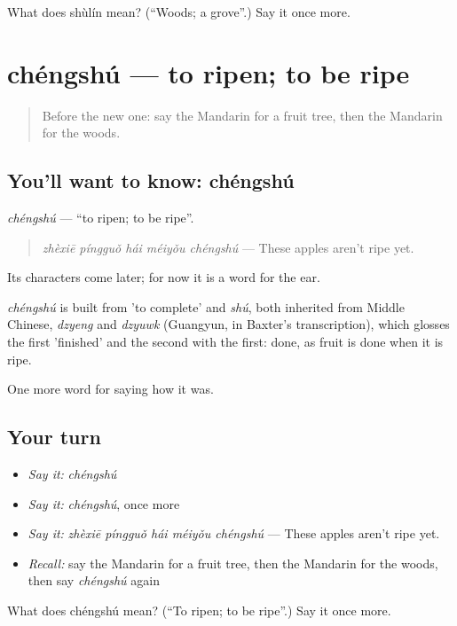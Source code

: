 \begin{tcolorbox}[breakable,colback=teal!4,colframe=teal!35!black,title={Before you move on}]
What does shùlín mean? (\textquotedblleft{}Woods; a grove\textquotedblright{}.) Say it once more.
\end{tcolorbox}
\section[chéngshú]{chéngshú — to ripen; to be ripe}

\label{lesson:ZH-C516-chengshu}



\begin{quote}
Before the new one: say the Mandarin for a fruit tree, then the Mandarin for the woods.
\end{quote}

\subsection*{You'll want to know: chéngshú}
\emph{chéngshú} — \textquotedblleft{}to ripen; to be ripe\textquotedblright{}.

\begin{quote}
\emph{zhèxiē píngguǒ hái méiyǒu chéngshú} — These apples aren't ripe yet.
\end{quote}

Its characters come later; for now it is a word for the ear.

\begin{cousinweb}
\emph{chéngshú} is built from  'to complete' and \emph{shú}, both inherited from Middle Chinese, \emph{dzyeng} and \emph{dzyuwk} (Guangyun, in Baxter's transcription), which glosses the first 'finished' and the second with the first: done, as fruit is done when it is ripe.
\end{cousinweb}

\begin{grammarlens}[title={What you've built}]
One more word for saying how it was.
\end{grammarlens}

\subsection*{Your turn}
\begin{itemize}
\raggedright
  \item \emph{Say it:} \emph{chéngshú}
  \item \emph{Say it:} \emph{chéngshú}, once more
  \item \emph{Say it:} \emph{zhèxiē píngguǒ hái méiyǒu chéngshú} — These apples aren't ripe yet.
  \item \emph{Recall:} say the Mandarin for a fruit tree, then the Mandarin for the woods, then say \emph{chéngshú} again
\end{itemize}

\begin{tcolorbox}[breakable,colback=teal!4,colframe=teal!35!black,title={Before you move on}]
What does chéngshú mean? (\textquotedblleft{}To ripen; to be ripe\textquotedblright{}.) Say it once more.
\end{tcolorbox}
